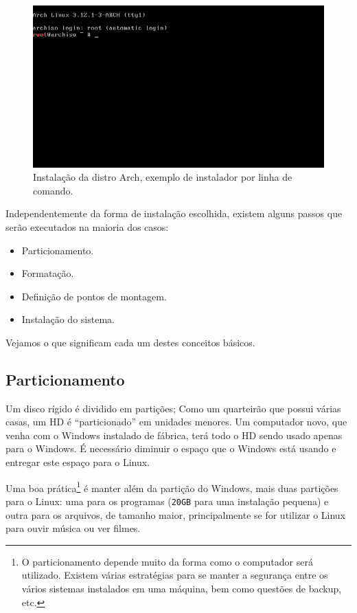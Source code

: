 \documentclass{handout_utfpr}
\begin{document}
\begin{figure}[h]
    \centering
    \includegraphics[scale=.5]{imagens/arch-install-01.png}
    \caption{Instalação da distro Arch, exemplo de instalador por linha de comando.}
    \label{fig:arch-installer}
\end{figure}

Independentemente da forma de instalação escolhida, existem alguns passos que serão executados na maioria dos casos:
\begin{itemize}
\item Particionamento.
\item Formatação.
\item Definição de pontos de montagem.
\item Instalação do sistema.
\end{itemize}

Vejamos o que significam cada um destes conceitos básicos.

\subsection{Particionamento}
Um disco rígido é dividido em partições; Como um quarteirão que possui várias casas, um HD é ``particionado'' em unidades menores. Um computador novo, que venha com o Windows instalado de fábrica, terá todo o HD sendo usado apenas para o Windows. É necessário diminuir o espaço que o Windows está usando e entregar este espaço para o Linux.

Uma boa prática\footnote{O particionamento depende muito da forma como o computador será utilizado. Existem várias estratégias para se manter a segurança entre os vários sistemas instalados em uma máquina, bem como questões de backup, etc.} é manter além da partição do Windows, mais duas partições para o Linux: uma para os programas (\texttt{20GB} para uma instalação pequena) e outra para os arquivos, de tamanho maior, principalmente se for utilizar o Linux para ouvir música ou ver filmes.
\end{document}
